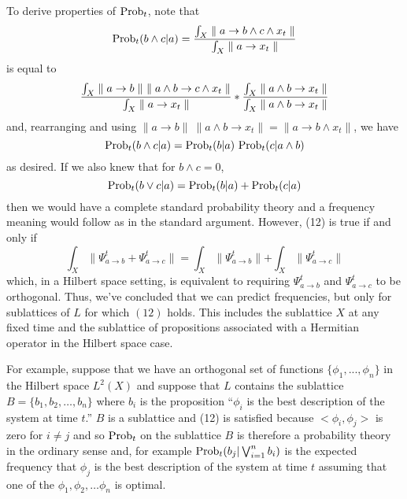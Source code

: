 \documentclass[12pt]{article}
\begin{document}
    To derive properties of ${\rm Prob}_t$, note that 
\begin{equation}
{\rm Prob}_t(b\wedge c|a)=
{{\int_{X}\parallel a\rightarrow b\wedge c\wedge x_t\parallel}\over
{\int_{X}\parallel a\rightarrow x_t\parallel}}
\end{equation}
is equal to 
\begin{equation}
{ {\int_{X} \parallel a\rightarrow b\parallel\ \parallel a\wedge b\rightarrow c\wedge x_t
\parallel}
\over{\int_{X} \parallel a\rightarrow x_t\parallel} } *
{ {\int_{X} \parallel a\wedge b \rightarrow x_t\parallel} \over 
  {\int_{X} \parallel a\wedge b \rightarrow x_t\parallel} }
\end{equation}
and, rearranging and using 
$\parallel a\rightarrow b\parallel\ \parallel a\wedge b\rightarrow x_t\parallel =
\parallel a\rightarrow b \wedge x_t\parallel$, we have 
\begin{equation}
{\rm Prob}_t(b\wedge c|a)={\rm Prob}_t(b | a)\ {\rm Prob}_t(c|a\wedge b)
\end{equation}
as desired.  If we also knew that for $b\wedge c=0$, 
\begin{equation}
{\rm Prob}_t(b\vee c|a)={\rm Prob}_t(b|a) + {\rm Prob}_t(c|a)
\end{equation}
then we would have a complete standard probability theory and a
frequency meaning would follow as in the standard argument.  However, (12) is 
true if and only if
\begin{equation}
\int_X\parallel\Psi^t_{a\rightarrow b}+\Psi^t_{a\rightarrow c}\parallel =
\int_X\parallel\Psi^t_{a\rightarrow b}\parallel +
\int_X\parallel\Psi^t_{a\rightarrow c}\parallel
\end{equation}
which, in a Hilbert space setting, is equivalent to requiring $\Psi^t_{a\rightarrow b}$
and $\Psi^t_{a\rightarrow c}$ to be orthogonal.  
Thus, we've concluded that we can predict frequencies, but only for 
sublattices of $L$ for which $(12)$ holds.  This includes the sublattice 
$X$ at any fixed time and the sublattice of propositions associated with 
a Hermitian operator in the Hilbert space case.  

For example, suppose that we have an orthogonal set of functions 
$\{\phi_1,...,\phi_n\}$ in the Hilbert space $L^2(X)$ and suppose 
that $L$ contains the sublattice $B=\{b_1,b_2,\dots,b_n\}$ where
$b_i$ is the proposition ``$\phi_i$ is the best description of the 
system at time $t$.''  $B$ is a sublattice and (12) is satisfied because 
$<\phi_i,\phi_j>$ is zero for $i\neq j$ and so ${\rm Prob}_t$ on the sublattice
$B$ is therefore a probability theory in the ordinary sense and, for example
${\rm Prob}_t (b_j|\bigvee_{i=1}^{n}b_i)$ is the expected frequency that
$\phi_j$ is the best description of the system at time $t$ assuming that one of the 
$\phi_1,\phi_2,\dots\phi_n$ is optimal.
\end{document}
